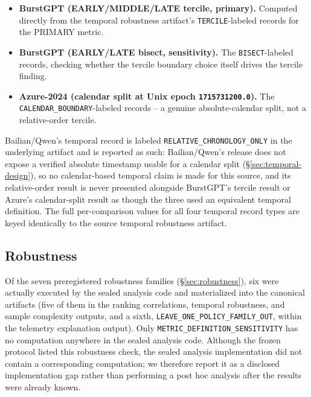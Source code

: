 \documentclass[sn-basic,Numbered,pdflatex]{sn-jnl}
\begin{document}
\begin{itemize}
  \item \textbf{BurstGPT (EARLY/MIDDLE/LATE tercile, primary).} Computed
    directly from the temporal robustness artifact's
    \texttt{TERCILE}-labeled records for the PRIMARY metric.
  \item \textbf{BurstGPT (EARLY/LATE bisect, sensitivity).} The
    \texttt{BISECT}-labeled records, checking whether the tercile boundary
    choice itself drives the tercile finding.
  \item \textbf{Azure-2024 (calendar split at Unix epoch
    \texttt{1715731200.0}).} The \texttt{CALENDAR\_BOUNDARY}-labeled
    records -- a genuine absolute-calendar split, not a relative-order
    tercile.
\end{itemize}

Bailian/Qwen's temporal record is labeled
\texttt{RELATIVE\_CHRONOLOGY\_ONLY} in the underlying artifact and is
reported as such: Bailian/Qwen's release does not expose a verified
absolute timestamp usable for a calendar split (\S\ref{sec:temporal-design}),
so no calendar-based temporal claim is made for this source, and its
relative-order result is never presented alongside BurstGPT's tercile
result or Azure's calendar-split result as though the three used an
equivalent temporal definition. The full per-comparison values for all
four temporal record types are keyed identically to the source temporal robustness artifact.

\subsection{Robustness}
\label{sec:results-robustness}

Of the seven preregistered robustness families (\S\ref{sec:robustness}), six were actually executed by the sealed analysis code and materialized into the canonical artifacts (five of them in the ranking correlations, temporal robustness, and sample complexity outputs, and a sixth, \texttt{LEAVE\_ONE\_POLICY\_FAMILY\_OUT}, within the telemetry explanation output). Only \texttt{METRIC\_DEFINITION\_SENSITIVITY} has no computation anywhere in the sealed analysis code. Although the frozen protocol listed this robustness check, the sealed analysis implementation did not contain a corresponding computation; we therefore report it as a disclosed implementation gap rather than performing a post hoc analysis after the results were already known.
\end{document}
